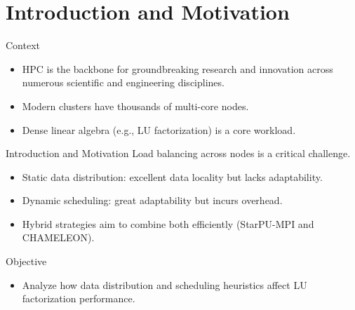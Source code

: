 \documentclass[12pt,xcolor=dvipsnames,presentation,aspectratio=169]{beamer}
\begin{document}
{\section{Introduction and Motivation}
\label{sec:org4ed9cdb}
\begin{frame}[label={sec:org6ffc0f5}]{Context}
\begin{itemize}
\item HPC is the backbone for groundbreaking research and innovation across numerous scientific and engineering disciplines.
\item Modern clusters have thousands of multi-core nodes.
\item Dense linear algebra (e.g., LU factorization) is a core workload.
\end{itemize}
\end{frame}
\begin{frame}[label={sec:orgc701df0}]{Introduction and Motivation}
Load balancing across nodes is a critical challenge.
\begin{itemize}
\item Static data distribution: excellent data locality but lacks adaptability.
\item Dynamic scheduling: great adaptability but incurs overhead.
\item Hybrid strategies aim to combine both efficiently (StarPU-MPI and CHAMELEON).
\end{itemize}
Objective
\begin{itemize}
\item Analyze how \alert{data distribution} and \alert{scheduling heuristics} affect LU factorization performance.
\end{itemize}
\end{frame}
}
\end{document}
